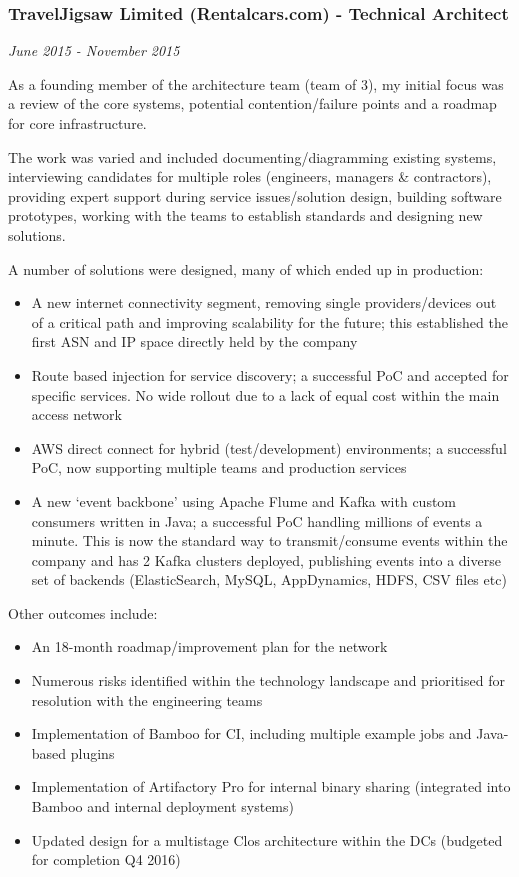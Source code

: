 \subsubsection{TravelJigsaw Limited (Rentalcars.com) - Technical
Architect}\label{traveljigsaw-limited-rentalcars.com---technical-architect}

\emph{June 2015 - November 2015}

As a founding member of the architecture team (team of 3), my initial
focus was a review of the core systems, potential contention/failure
points and a roadmap for core infrastructure.

The work was varied and included documenting/diagramming existing
systems, interviewing candidates for multiple roles (engineers, managers
\& contractors), providing expert support during service issues/solution
design, building software prototypes, working with the teams to
establish standards and designing new solutions.

A number of solutions were designed, many of which ended up in
production:

\begin{itemize}
\itemsep1pt\parskip0pt
\item
  A new internet connectivity segment, removing single providers/devices
  out of a critical path and improving scalability for the future; this
  established the first ASN and IP space directly held by the company
\item
  Route based injection for service discovery; a successful PoC and
  accepted for specific services. No wide rollout due to a lack of equal
  cost within the main access network
\item
  AWS direct connect for hybrid (test/development) environments; a
  successful PoC, now supporting multiple teams and production services
\item
  A new `event backbone' using Apache Flume and Kafka with custom
  consumers written in Java; a successful PoC handling millions of
  events a minute. This is now the standard way to transmit/consume
  events within the company and has 2 Kafka clusters deployed,
  publishing events into a diverse set of backends (ElasticSearch,
  MySQL, AppDynamics, HDFS, CSV files etc)
\end{itemize}

Other outcomes include:

\begin{itemize}
\itemsep1pt\parskip0pt
\item
  An 18-month roadmap/improvement plan for the network
\item
  Numerous risks identified within the technology landscape and
  prioritised for resolution with the engineering teams
\item
  Implementation of Bamboo for CI, including multiple example jobs and
  Java-based plugins
\item
  Implementation of Artifactory Pro for internal binary sharing
  (integrated into Bamboo and internal deployment systems)
\item
  Updated design for a multistage Clos architecture within the DCs
  (budgeted for completion Q4 2016)
\end{itemize}

